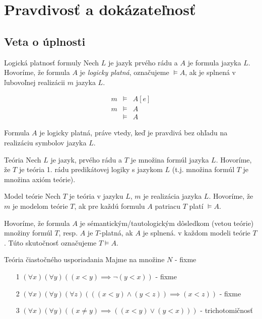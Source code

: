 \section{Pravdivosť a dokázateľnosť}
\subsection{Veta o úplnosti}

\begin{definicia}{Logická platnosť formuly}
    Nech $L$ je jazyk prvého rádu a $A$ je formula jazyka
    $L$. Hovoríme, že formula $A$ je \emph{logicky platná},
    označujeme $\models A$,
    ak je splnená v ľubovoľnej realizácii $m$ jazyka $L$.

    \begin{align*}
        m & \models & A[e] \\
        m & \models & A \\
        & \models & A
    \end{align*}
\end{definicia}

\begin{poznamka}
    Formula $A$ je logicky platná, práve vtedy, keď je pravdivá
    bez ohľadu na realizáciu symbolov jazyka $L$.
\end{poznamka}

\begin{definicia}{Teória}
    Nech $L$ je jazyk, prvého rádu a $T$ je množina formúl
    jazyka $L$. Hovoríme, že $T$ je teória 1. rádu predikátovej logiky
    s jazykom $L$ (t.j. množina formúl $T$ je množina axióm teórie).
\end{definicia}

\begin{definicia}{Model teórie}
    Nech $T$ je teória v jazyku $L$, $m$ je realizácia jazyka $L$.
    Hovoríme, že $m$ je modelom teórie $T$, ak pre každú formulu $A$
    patriacu $T$ platí $\models A$.

    Hovoríme, že formula $A$ je
    sémantickým/tautologickým dôsledkom (vetou teórie) množiny formúl $T$,
    resp. $A$ je $T$-platná, ak $A$ je splnená.
    v každom modeli teórie $T$.
    Túto skutočnosť označujeme $T \models A$.
\end{definicia}

\begin{priklad}{Teória čiastočného usporiadania}
    Majme  na množine $N$ - fixme
    \begin{itemize}
    \item[1] $(\forall x)(\forall y) ((x < y) \implies \neg (y < x))$ - fixme
    \item[2] $(\forall x)(\forall y)(\forall z) (((x<y) \land (y<z)) \implies
        (x<z))$ - fixme
    \item[3] $(\forall x)(\forall y)( (x\not=y) \implies ((x<y) \lor (y<x)))$ -
     trichotomičnosť
    \end{itemize}
\end{priklad}

